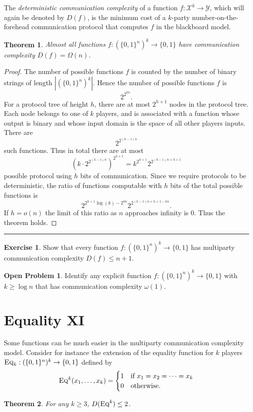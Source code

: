 \documentclass[11pt]{amsart}
\theoremstyle{plain}
\newtheorem{theorem}{Theorem}
\theoremstyle{definition}
\newtheorem{exercise}{Exercise}
\newtheorem{open}{Open Problem}
\theoremstyle{plain}
\newcommand{\calX}{\mathcal{X}}
\newcommand{\calY}{\mathcal{Y}}
\newcommand{\Eq}{\textsc{Eq}}
\newcommand{\exercises}{\bigskip \noindent\rule{8cm}{0.4pt} \medskip}
\begin{document}
The \emph{deterministic communication complexity} of a function $f : \calX^k \to \calY$, which will again be denoted by $D(f)$, is the minimum cost of a $k$-party number-on-the-forehead communication protocol that computes $f$ in the blackboard model.

\begin{theorem}
Almost all functions $f : (\{0,1\}^{n})^k \to \{0,1\}$ have communication complexity $D(f) = \Omega(n)$.
\end{theorem}

\begin{proof}
The number of possible functions $f$ is counted by the number of binary strings of length $|(\{0,1\}^n)^k|$. Hence the number of possible functions $f$ is 
$$2^{2^{kn}}.$$
For a protocol tree of height $h$, there are at most $2^{h+1}$ nodes in the protocol tree. Each node belongs to one of $k$ players, and is associated with a function whose output is binary and whose input domain is the space of all other players inputs. There are 
$$2^{2^{(k-1)n}}$$ 
such functions. Thus in total there are at most
$$(k\cdot 2^{2^{(k-1)n}})^{2^{h+1}} = k^{2^{h+1}}2^{2^{(k-1)n + h + 1}}$$
possible protocol using $h$ bits of communication. Since we require protocols to be deterministic, the ratio of functions computable with $h$ bits of the total possible functions is 
$$ 2^{2^{h+1}\log(k) - 2^{kn}}2^{2^{(k-1)n +h + 1 -kn}}.$$
If $h = o(n)$ the limit of this ratio as $n$ approaches infinity is $0$. Thus the theorem holds.
\end{proof}

\exercises

\begin{exercise}
Show that every function $f : (\{0,1\}^{n})^k \to \{0,1\}$ has multiparty communication complexity $D(f) \le n+1$.
\end{exercise}

\begin{open}
Identify any explicit function $f : (\{0,1\}^{n})^k \to \{0,1\}$ with $k \ge \log n$ that has communication complexity $\omega(1)$.
\end{open}


\newpage 
\section{Equality XI}

Some functions can be much easier in the multiparty communication complexity model. Consider for instance the extension of the equality function for $k$ players $\Eq_k : (\{0,1\}^n)^k \to \{0,1\}$ defined by
\[
\Eq^k(x_1,\ldots,x_k) = \begin{cases}
1 & \mbox{if } x_1 = x_2 = \cdots = x_k \\
0 & \mbox{otherwise.}
\end{cases}
\]
\begin{theorem}
For any $k \ge 3$, $D(\Eq^k) \le 2$.
\end{theorem}
\end{document}
